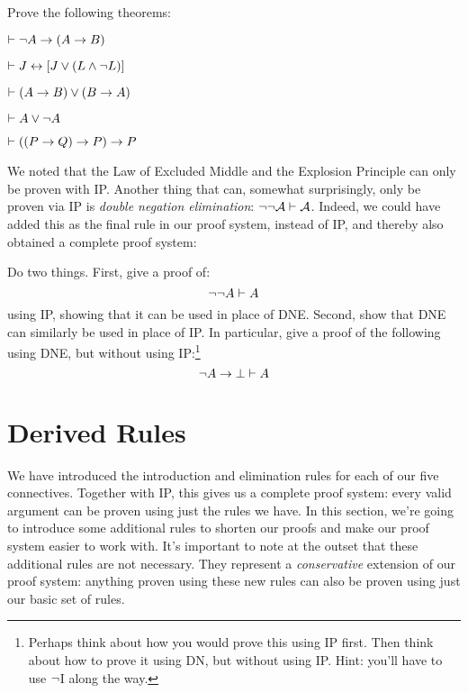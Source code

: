 \problempart 
Prove the following theorems:

\begin{earg}
\item $\vdash \neg A \rightarrow (A \rightarrow B)$
\item $\vdash J \leftrightarrow [J\vee (L\wedge\neg L)]$
\item $\vdash (A \rightarrow B) \vee (B \rightarrow A)$
\item $\vdash A \vee \neg A$ %
\item $\vdash ((P \rightarrow Q) \rightarrow P) \rightarrow P$ %
\end{earg}

\problempart
We noted that the Law of Excluded Middle and the Explosion Principle can only be proven with IP.  Another thing that can, somewhat surprisingly, only be proven via IP is \emph{double negation elimination}:  $\neg \neg \mathcal{A} \vdash \mathcal{A}$.  Indeed, we could have added this as the final rule in our proof system, instead of IP, and thereby also obtained a complete proof system:


\noindent Do two things.  First, give a proof of:
$$\neg \neg A \vdash A$$ 
using IP, showing that it can be used in place of DNE.  Second, show that DNE can similarly be used in place of IP.  In particular, give a proof of the following using DNE, but without using IP:\footnote{Perhaps think about how you would prove this using IP first.  Then think about how to prove it using DN, but without using IP.  Hint: you'll have to use $\neg$I along the way.}
$$\neg A \rightarrow \bot \vdash  A$$



\section{Derived Rules}\label{s:TFLDerivedRules}

We have introduced the introduction and elimination rules for each of our five connectives.  Together with IP, this gives us a complete proof system: every valid argument can be proven using just the rules we have.  In this section, we're going to introduce some additional rules to shorten our proofs and make our proof system easier to work with.  It's important to note at the outset that these additional rules are not necessary.  They represent a \emph{conservative} extension of our proof system: anything proven using these new rules can also be proven using just our basic set of rules.

